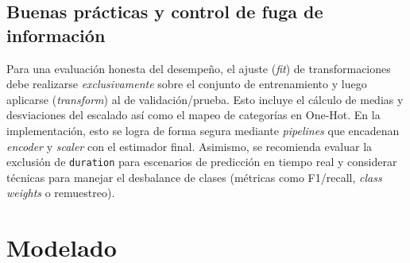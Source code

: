 \documentclass[10pt]{article}
\begin{document}
\subsection*{Buenas prácticas y control de fuga de información}
Para una evaluación honesta del desempeño, el ajuste (\emph{fit}) de transformaciones debe realizarse \emph{exclusivamente} sobre el conjunto de entrenamiento y luego aplicarse (\emph{transform}) al de validación/prueba. Esto incluye el cálculo de medias y desviaciones del escalado así como el mapeo de categorías en One-Hot. En la implementación, esto se logra de forma segura mediante \emph{pipelines} que encadenan \textit{encoder} y \textit{scaler} con el estimador final. Asimismo, se recomienda evaluar la exclusión de \texttt{duration} para escenarios de predicción en tiempo real y considerar técnicas para manejar el desbalance de clases (métricas como F1/recall, \emph{class weights} o remuestreo).






\section{Modelado}
\end{document}
